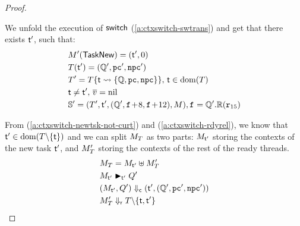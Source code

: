 \begin{proof}
\begin{enumerate}
        We unfold the execution of $\mathsf{switch}{}$ (\ref{a:ctxswitch-swtrans})
        and get that there exists $\textsf{t}'$, such that: 
        \begin{align}
            & M'(\mathsf{TaskNew}) = (\textsf{t}', 0) \\
            & T(\textsf{t}') = (\mathbb{Q}', \texttt{pc}', \texttt{npc}') \label{a:ctxswitch-newtsk} \\
            & T' = T\{ \textsf{t} \leadsto \{ \mathbb{Q}, \texttt{pc}, \texttt{npc} \} \}, \,
                \textsf{t} \in \text{dom}(T) \\
            & \textsf{t} \neq \textsf{t}', \, \overline{v} = \text{nil} \label{a:ctxswitch-newtsk-not-curt} \\
            & \mathbb{S}' = (T', \textsf{t}', (\mathbb{Q}', \texttt{f}_{}\!+\!8, \texttt{f}_{}\!+\!12), 
                M{}), \texttt{f}_{} = \mathbb{Q}'.\mathbb{R}(\texttt{r}_{15}) 
        \end{align} 
    \end{enumerate} 

    From (\ref{a:ctxswitch-newtsk-not-curt}) and 
    (\ref{a:ctxswitch-rdyrel}), we know that $\textsf{t}' \in \text{dom}(T\backslash\{\textsf{t}\})$ 
    and we can split $M_T$ as two parts: 
    $M_{\textsf{t}'}$ storing the contexts of the new task $\textsf{t}'$, 
    and $M_T'$ storing the contexts of the rest of the ready threads. 
    \begin{align}
        & M_T = M_{\textsf{t}'}\uplus M_{T}' \\
        & {M_{\textsf{t}'}} \blacktriangleright_{\textsf{t}'} {Q'} \\
        & {(M_{\textsf{t}'}, Q')} \Downarrow_{\textsf{c}} {(\textsf{t}', (\mathbb{Q}', \texttt{pc}', \texttt{npc}'))} \\
        & {M_T'} \Downarrow_{\textsf{r}} {T\backslash\{\textsf{t}, \textsf{t}'\}}
    \end{align}


\end{proof}
